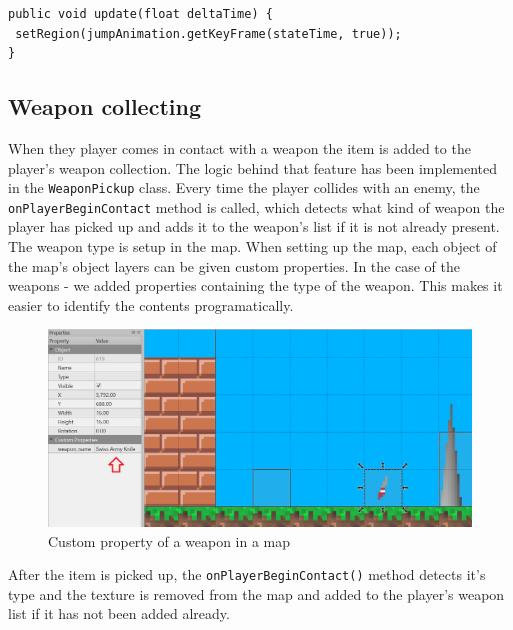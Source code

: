 \documentclass[12p]{article}
\begin{document}
\begin{verbatim}
public void update(float deltaTime) {
 setRegion(jumpAnimation.getKeyFrame(stateTime, true));
}
\end{verbatim}


\newpage
\subsection{Weapon collecting} \label{DocWeaponCollection}

When they player comes in contact with a weapon the item is added to the player's weapon collection. The logic behind that feature has been implemented in the \texttt{WeaponPickup} class. Every time the player collides with an enemy, the \texttt{onPlayerBeginContact} method is called, which detects what kind of weapon the player has picked up and adds it to the weapon's list if it is not already present. The weapon type is setup in the map. When setting up the map, each object of the map's object layers can be given custom properties. In the case of the weapons - we added properties containing the type of the weapon. This makes it easier to identify the contents programatically.

\begin{figure}[ht]
 \center
 \includegraphics[width=1\textwidth]{Documentation/weaponMaps.png}
 \caption{Custom property of a weapon in a map}
\end{figure}

After the item is picked up, the \texttt{onPlayerBeginContact()} method detects it's type and the texture is removed from the map and added to the player's weapon list if it has not been added already.
\end{document}
